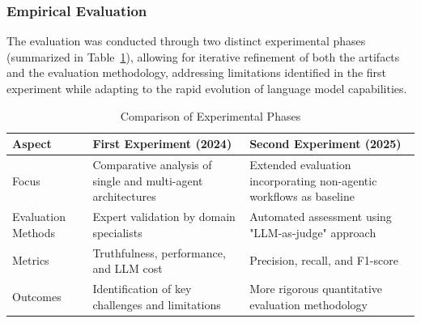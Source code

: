         \subsubsection{Empirical Evaluation}
        
        The evaluation was conducted through two distinct experimental phases (summarized in Table~\ref{tab:experiments}), allowing for iterative refinement of both the artifacts and the evaluation methodology, addressing limitations identified in the first experiment while adapting to the rapid evolution of language model capabilities.
        
        \begin{table}[h]
        \centering
        \caption{Comparison of Experimental Phases}
        \begin{tabular}{|p{}|p{}|p{}|}
        \hline
        \textbf{Aspect} & \textbf{First Experiment (2024)} & \textbf{Second Experiment (2025)} \\
        \hline
        Focus & Comparative analysis of single and multi-agent architectures & Extended evaluation incorporating non-agentic workflows as baseline \\
        \hline
        Evaluation Methods & Expert validation by domain specialists & Automated assessment using "LLM-as-judge" approach \\
        \hline
        Metrics & Truthfulness, performance, and LLM cost & Precision, recall, and F1-score \\
        \hline
        Outcomes & Identification of key challenges and limitations & More rigorous quantitative evaluation methodology \\
        \hline
        \end{tabular}
        \label{tab:experiments}
        \end{table}

    
    
        
